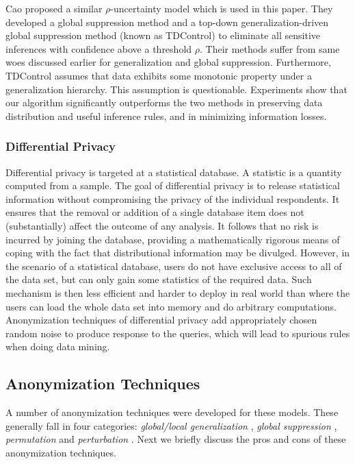 Cao \etal \cite{Cao:2010:rho} proposed a similar $\rho$-uncertainty model
which is used in this paper.
They developed a global suppression method and a top-down
generalization-driven global suppression method (known as TDControl)
to eliminate all sensitive inferences with confidence above
a threshold $\rho$.
Their methods suffer from same woes discussed earlier for generalization and
global suppression.
Furthermore, TDControl
assumes that data exhibits some monotonic property under a generalization
hierarchy. This assumption is questionable.
Experiments show that our algorithm significantly outperforms the
two methods in preserving data distribution and useful
inference rules, and in minimizing information losses.

\subsubsection{Differential Privacy}

Differential privacy \cite{Dwork08:diff:survey}
is targeted at a statistical database. A statistic is a quantity computed from a sample.
The goal of differential privacy is to release statistical information without
compromising the privacy of the individual respondents.
It ensures that the removal or addition of a single database item does not
(substantially) affect the outcome of any analysis.
It follows that no risk is incurred by joining the database,
providing a mathematically rigorous means of coping with
the fact that distributional information may be divulged.
However, in the scenario of a statistical database,
users do not have exclusive access to all of the data set, but can only gain some statistics of the required data.
Such mechanism is then less efficient and harder to
deploy in real world than where the users can load the
whole data set into memory and do arbitrary computations.
Anonymization techniques of differential privacy add appropriately chosen random noise to produce response to the queries,
which will lead to spurious rules when doing data mining.

\subsection{Anonymization Techniques}

A number of anonymization techniques
were developed for these models.
These generally fall in four categories\cite{Machanavajjhala12}: {\em
global/local generalization}
\cite{samarati1998,Iyengar:2002:TDS,LeFevre:2006:Mondrian,Terrovitis:2008:PAS,He:2009:ASD,Cao:2010:rho}, {\em global suppression} \cite{atallah99:disclosure,Xu:2008:ATD,Cao:2010:rho},
{\em permutation} \cite{2011:TKDE:Anonymous} and {\em perturbation}
\cite{Zhang:2007:agg,ChenMFDX11:Diff,Javier2012,WangW05}. Next we briefly discuss the pros and
cons of these anonymization techniques.

